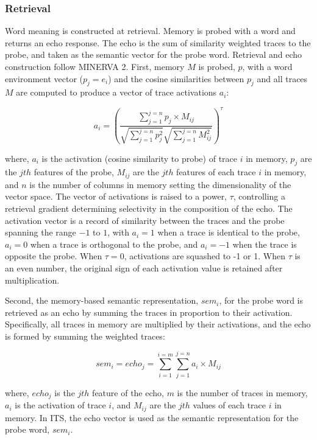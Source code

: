 \documentclass[10pt,letterpaper]{article}
\begin{document}
\subsubsection{Retrieval}\label{retrieval}

Word meaning is constructed at retrieval. Memory is probed with a word and returns an echo response. The echo is the sum of similarity weighted traces to the probe, and taken as the semantic vector for the probe word. Retrieval and echo construction follow MINERVA 2. First, memory \(M\) is probed, $p$, with a word environment vector ($p_j = e_i$) and the cosine similarities between \(p_j\) and all traces \(M\) are computed to produce a vector of trace activations \(a_i\):

\begin{equation}
a_i = (\frac{\sum_{j=1}^{j=n}p_j \times M_{ij}}{\sqrt{\sum_{j=1}^{j=n}p_j^2}\sqrt{\sum_{j=1}^{j=n}M_{ij}^2}})^{\tau}
\label{eq:activation}
\end{equation}

\noindent where, \(a_i\) is the activation (cosine similarity to probe) of trace \(i\) in memory, \(p_j\) are the \(jth\) features of the probe, \(M_{ij}\) are the \(jth\) features of each trace \(i\) in memory, and \(n\) is the number of columns in memory setting the dimensionality of the vector space. The vector of activations is raised to a power, \({\tau}\), controlling a retrieval gradient determining selectivity in the composition of the echo. The activation vector is a record of similarity between the traces and the probe spanning the range \(-1\) to \(1\), with \(a_i = 1\) when a trace is identical to the probe, \(a_i = 0\) when a trace is orthogonal to the probe, and \(a_i = -1\) when the trace is opposite the probe. When  \({\tau} = 0\), activations are squashed to -1 or 1. When \({\tau}\) is an even number, the original sign of each activation value is retained after multiplication. 

Second, the memory-based semantic representation, $sem_i$, for the probe word is retrieved as an echo by summing the traces in proportion to their activation. Specifically, all traces in memory are multiplied by their activations, and the echo is formed by summing the weighted traces:

\begin{equation}
sem_i = echo_j = \sum_{i=1}^{i=m}\sum_{j=1}^{j=n}a_i \times M_{ij}
\label{eq:echo}
\end{equation}

\noindent where, \(echo_j\) is the \(jth\) feature of the echo, \(m\) is the number of traces in memory, \(a_i\) is the activation of trace \(i\), and \(M_{ij}\) are the \(jth\) values of each trace \(i\) in memory. In ITS, the echo vector is used as the semantic representation for the probe word, $sem_i$.
\end{document}
